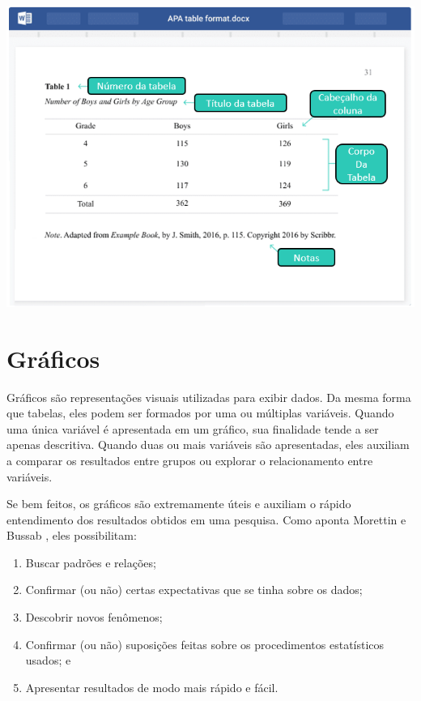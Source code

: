 \documentclass[
]{book}
\providecommand{\tightlist}{%
  \setlength{\itemsep}{0pt}\setlength{\parskip}{0pt}}
\begin{document}
\includegraphics{./img/cap_desc_tabela.png}

\hypertarget{gruxe1ficos}{%
\section{Gráficos}\label{gruxe1ficos}}

Gráficos são representações visuais utilizadas para exibir dados. Da mesma forma que tabelas, eles podem ser formados por uma ou múltiplas variáveis. Quando uma única variável é apresentada em um gráfico, sua finalidade tende a ser apenas descritiva. Quando duas ou mais variáveis são apresentadas, eles auxiliam a comparar os resultados entre grupos ou explorar o relacionamento entre variáveis.

Se bem feitos, os gráficos são extremamente úteis e auxiliam o rápido entendimento dos resultados obtidos em uma pesquisa. Como aponta Morettin e Bussab \citeyearpar{morettin_bussab_2010}, eles possibilitam:

\begin{enumerate}
\def\labelenumi{(\alph{enumi})}
\tightlist
\item
  Buscar padrões e relações;\\
\item
  Confirmar (ou não) certas expectativas que se tinha sobre os dados;\\
\item
  Descobrir novos fenômenos;\\
\item
  Confirmar (ou não) suposições feitas sobre os procedimentos estatísticos usados; e\\
\item
  Apresentar resultados de modo mais rápido e fácil.
\end{enumerate}
\end{document}
